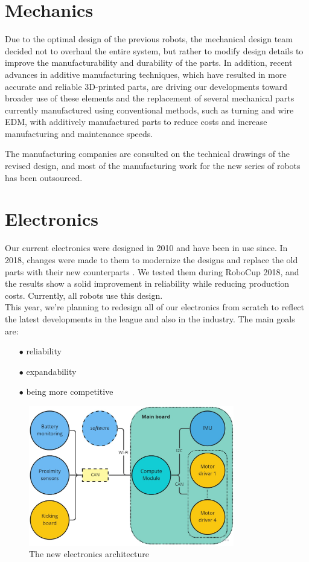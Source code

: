 \documentclass[runningheads]{llncs}
\begin{document}
\section {Mechanics}
Due to the optimal design of the previous robots, the mechanical design team decided not to overhaul the entire system, but rather to modify design details to improve the manufacturability and durability of the parts. In addition, recent advances in additive manufacturing techniques, which have resulted in more accurate and reliable 3D-printed parts, are driving our developments toward broader use of these elements and the replacement of several mechanical parts currently manufactured using conventional methods, such as turning and wire EDM, with additively manufactured parts to reduce costs and increase manufacturing and maintenance speeds.

The manufacturing companies are consulted on the technical drawings of the revised design, and most of the manufacturing work for the new series of robots has been outsourced.

\section{Electronics}

Our current electronics were designed in 2010 and have been in use since. In 2018, changes were made to them to modernize the designs and replace the old parts with their new counterparts \cite{ref_ETDP2018}. We tested them during RoboCup 2018, and the results show a solid improvement in reliability while reducing production costs. Currently, all robots use this design.\\
\indent This year, we're planning to redesign all of our electronics from scratch to reflect the latest developments in the league and also in the industry. The main goals are:

\begin{enumerate}
    \item[$\bullet$] reliability
    \item[$\bullet$] expandability
    \item[$\bullet$] being more competitive
\end{enumerate}

\begin{figure}
	\centering
	\includegraphics[width=0.8\textwidth]{images/electronics-architecture.jpg}
	\caption{The new electronics architecture}
	\label{fig:electronics-architecture}
\end{figure}
\end{document}

